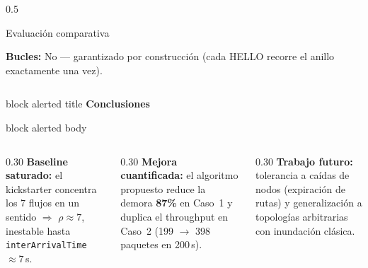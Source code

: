 \documentclass[final]{beamer}
\begin{document}
\begin{frame}[t]
\begin{columns}[T,totalwidth=\paperwidth]
\begin{column}{0.5\paperwidth}
\begin{block}{Evaluación comparativa}
  \vspace{0.3cm}
  \raggedright
  \textbf{Bucles:} No — garantizado por construcción (cada HELLO recorre el anillo exactamente una vez).
\end{block}

\end{column}

\end{columns}

\vspace{0.4cm}

\begin{beamercolorbox}[wd=\paperwidth,leftskip=1.5cm,rightskip=1.5cm,sep=0.4cm]{block alerted title}
  {\LARGE\bfseries Conclusiones}
\end{beamercolorbox}
\begin{beamercolorbox}[wd=\paperwidth,leftskip=1.5cm,rightskip=1.5cm,sep=0.5cm]{block alerted body}
  \begin{columns}[T,totalwidth=0.93\paperwidth]
    \begin{column}{0.30\linewidth}
      \Large\textbf{Baseline saturado:} el kickstarter concentra los 7 flujos
      en un sentido $\Rightarrow$ $\rho \approx 7$, inestable hasta
      \texttt{interArrivalTime} $\approx 7$\,s.
    \end{column}
    \begin{column}{0.30\linewidth}
      \Large\textbf{Mejora cuantificada:} el algoritmo propuesto reduce la
      demora \textbf{87\%} en Caso~1 y duplica el throughput en Caso~2
      (199 $\to$ 398 paquetes en 200\,s).
    \end{column}
    \begin{column}{0.30\linewidth}
      \Large\textbf{Trabajo futuro:} tolerancia a caídas de nodos
      (expiración de rutas) y generalización a topologías arbitrarias
      con inundación clásica.
    \end{column}
  \end{columns}
\end{beamercolorbox}

\end{frame}
\end{document}
